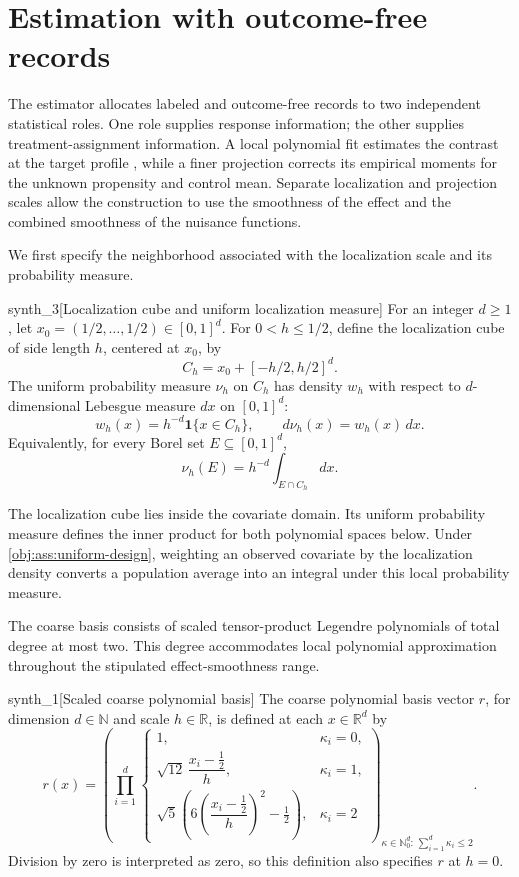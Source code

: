 \section{Estimation with outcome-free records}\label{sec:estimation}

The estimator allocates labeled and outcome-free records to two independent statistical roles. One role supplies response information; the other supplies treatment-assignment information. A local polynomial fit estimates the contrast at the target profile , while a finer projection corrects its empirical moments for the unknown propensity and control mean. Separate localization and projection scales allow the construction to use the smoothness of the effect and the combined smoothness of the nuisance functions.

We first specify the neighborhood associated with the localization scale  and its probability measure.

\begin{definitionv}{synth_3}[Localization cube and uniform localization measure]
For an integer \(d\ge1\), let \(x_0=(1/2,\ldots,1/2)\in[0,1]^d\). For \(0<h\le1/2\), define the localization cube of side length \(h\), centered at \(x_0\), by
\[
C_h=x_0+[-h/2,h/2]^d.
\]
The uniform probability measure \(\nu_h\) on \(C_h\) has density \(w_h\) with respect to \(d\)-dimensional Lebesgue measure \(dx\) on \([0,1]^d\):
\[
w_h(x)=h^{-d}\mathbf1\{x\in C_h\},
\qquad
d\nu_h(x)=w_h(x)\,dx.
\]
Equivalently, for every Borel set \(E\subseteq[0,1]^d\),
\[
\nu_h(E)=h^{-d}\int_{E\cap C_h}dx.
\]
\end{definitionv}

The localization cube  lies inside the covariate domain. Its uniform probability measure  defines the inner product for both polynomial spaces below. Under \cref{obj:ass:uniform-design}, weighting an observed covariate by the localization density  converts a population average into an integral under this local probability measure.

The coarse basis  consists of scaled tensor-product Legendre polynomials of total degree at most two. This degree accommodates local polynomial approximation throughout the stipulated effect-smoothness range.

\begin{definitionv}{synth_1}[Scaled coarse polynomial basis]
The coarse polynomial basis vector \(r\), for dimension \(d\in\mathbb N\) and scale \(h\in\mathbb R\), is defined at each \(x\in\mathbb R^d\) by
\[
r(x)=
\left(
\prod_{i=1}^{d}
\begin{cases}
1, & \kappa_i=0,\\
\sqrt{12}\,\dfrac{x_i-\tfrac12}{h}, & \kappa_i=1,\\
\sqrt{5}\left(6\left(\dfrac{x_i-\tfrac12}{h}\right)^2-\tfrac12\right),
& \kappa_i=2
\end{cases}
\right)_{\kappa\in\mathbb N_0^d:\,\sum_{i=1}^{d}\kappa_i\le 2}.
\]
Division by zero is interpreted as zero, so this definition also specifies \(r\) at \(h=0\).
\end{definitionv}

